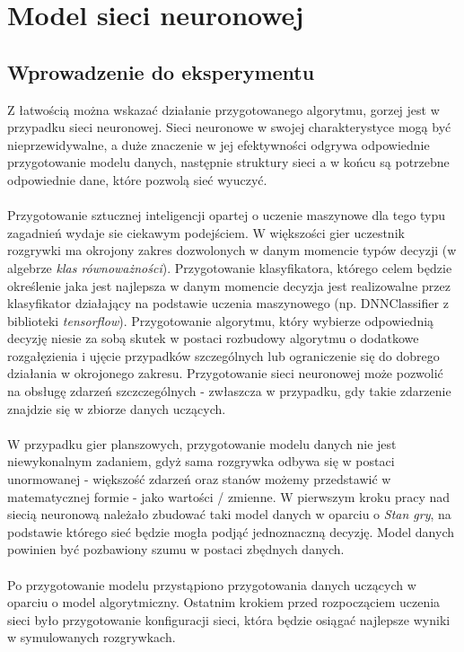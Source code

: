 \documentclass[12pt, oneside]{report}
\begin{document}
\chapter{Model sieci neuronowej}
\section{Wprowadzenie do eksperymentu}
Z łatwością można wskazać działanie przygotowanego algorytmu, gorzej jest w przypadku sieci neuronowej. Sieci neuronowe w swojej charakterystyce mogą być nieprzewidywalne, a duże znaczenie w jej efektywności odgrywa odpowiednie przygotowanie modelu danych, następnie struktury sieci a w końcu są potrzebne odpowiednie dane, które pozwolą sieć wyuczyć. \\ \\
Przygotowanie sztucznej inteligencji opartej o uczenie maszynowe dla tego typu zagadnień wydaje sie ciekawym podejściem. W większości gier uczestnik rozgrywki ma okrojony zakres dozwolonych w danym momencie typów decyzji (w algebrze  \textit{klas równoważności}). Przygotowanie klasyfikatora, którego celem będzie określenie jaka jest najlepsza w danym momencie decyzja jest realizowalne przez klasyfikator działający na podstawie uczenia maszynowego (np. DNNClassifier z biblioteki \textit{tensorflow}). Przygotowanie algorytmu, który wybierze odpowiednią decyzję niesie za sobą skutek w postaci rozbudowy algorytmu o dodatkowe rozgałęzienia i ujęcie przypadków szczególnych lub ograniczenie się do dobrego działania w okrojonego zakresu. Przygotowanie sieci neuronowej może pozwolić na obsługę zdarzeń szczczególnych - zwłaszcza w przypadku, gdy takie zdarzenie znajdzie się w zbiorze danych uczących.
 \\ \\ W przypadku gier planszowych, przygotowanie modelu danych nie jest niewykonalnym zadaniem, gdyż sama rozgrywka odbywa się w postaci unormowanej - większość zdarzeń oraz stanów możemy przedstawić w matematycznej formie - jako wartości / zmienne. W pierwszym kroku pracy nad siecią neuronową należało zbudować taki model danych w oparciu o \textit{Stan gry}, na podstawie którego sieć będzie mogła podjąć jednoznaczną decyzję. Model danych powinien być pozbawiony szumu w postaci zbędnych danych.
 \\ \\ Po przygotowanie modelu przystąpiono przygotowania danych uczących w oparciu o model algorytmiczny. Ostatnim krokiem przed rozpocząciem uczenia sieci było przygotowanie konfiguracji sieci, która będzie osiągać najlepsze wyniki w symulowanych rozgrywkach.
\end{document}
